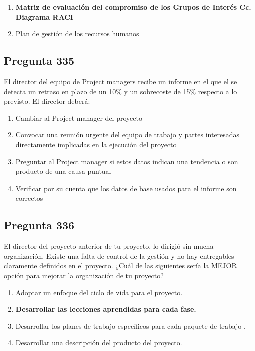 \documentclass[11pt,a4paper]{article}
\begin{document}
\begin{enumerate}[label=\alph*)]
  \item \textbf{Matriz de evaluación del compromiso de los Grupos de Interés Cc. Diagrama RACI}
  \item Plan de gestión de los recursos humanos
\end{enumerate}

\subsection*{Pregunta 335}
El director del equipo de Project managers recibe un informe en el que el se detecta un retraso en plazo de un 10\% y un sobrecoste de 15\% respecto a lo previsto. El director deberá:

\begin{enumerate}[label=\alph*)]
  \item Cambiar al Project manager del proyecto
  \item Convocar una reunión urgente del equipo de trabajo y partes interesadas directamente implicadas en la ejecución del proyecto
  \item Preguntar al Project manager si estos datos indican una tendencia o son producto de una causa puntual
  \item Verificar por su cuenta que los datos de base usados para el informe son correctos
\end{enumerate}

\subsection*{Pregunta 336}
El director del proyecto anterior de tu proyecto, lo dirigió sin mucha organización. Existe una falta de control de la gestión y no hay entregables claramente definidos en el proyecto. ¿Cuál de las siguientes sería la MEJOR opción para mejorar la organización de tu proyecto?

\begin{enumerate}[label=\alph*)]
  \item Adoptar un enfoque del ciclo de vida para el proyecto.
  \item \textbf{Desarrollar las lecciones aprendidas para cada fase.}
  \item Desarrollar los planes de trabajo específicos para cada paquete de trabajo .
  \item Desarrollar una descripción del producto del proyecto.
\end{enumerate}
\end{document}
